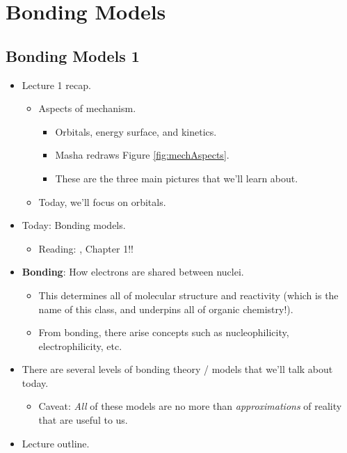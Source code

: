 \documentclass[../notes.tex]{subfiles}
\begin{document}
\chapter{Bonding Models}
\section{Bonding Models 1}
\begin{itemize}
    \item {}Lecture 1 recap.
    \begin{itemize}
        \item Aspects of mechanism.
        \begin{itemize}
            \item Orbitals, energy surface, and kinetics.
            \item Masha redraws Figure \ref{fig:mechAspects}.
            \item These are the three main pictures that we'll learn about.
        \end{itemize}
        \item Today, we'll focus on orbitals.
    \end{itemize}
    \item Today: Bonding models.
    \begin{itemize}
        \item Reading: \textcite{bib:Anslyn}, Chapter 1!!
    \end{itemize}
    \item \textbf{Bonding}: How electrons are shared between nuclei.
    \begin{itemize}
        \item This determines all of molecular structure and reactivity (which is the name of this class, and underpins all of organic chemistry!).
        \item From bonding, there arise concepts such as nucleophilicity, electrophilicity, etc.
    \end{itemize}
    \item There are several levels of bonding theory / models that we'll talk about today.
    \begin{itemize}
        \item Caveat: \emph{All} of these models are no more than \emph{approximations} of reality that are useful to us.
    \end{itemize}
    \item Lecture outline.
    \begin{enumerate}

\end{enumerate}
\end{itemize}
\end{document}
